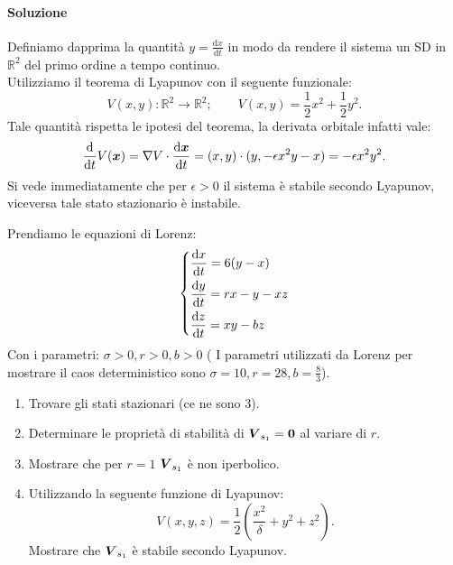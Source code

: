 \paragraph{Soluzione}%
Definiamo dapprima la quantità $y = \frac{\text{d} x}{\text{d} t}$ in modo da rendere il sistema un SD in $\mathbb{R}^2$ del primo ordine a tempo continuo.\\
Utilizziamo il teorema di Lyapunov con il seguente funzionale:
\[
    V(x, y): \mathbb{R}^2\to \mathbb{R}^2; \qquad V(x,y) = \frac{1}{2}x^2+\frac{1}{2}y^2
.\] 
Tale quantità rispetta le ipotesi del teorema, la derivata orbitale infatti vale:
\[
    \frac{\text{d} }{\text{d} t} V(\boldsymbol{x}) = \nabla V \cdot \frac{\text{d} \boldsymbol{x}}{\text{d} t} =
    (x,y) \cdot (y, -\epsilon x^2y - x) = -\epsilon x^2y^2 
.\] 
Si vede immediatamente che per $\epsilon >0$ il sistema è stabile secondo Lyapunov, viceversa tale stato stazionario è instabile.
\begin{ex}
   Prendiamo le equazioni di Lorenz: 
   \[
   \begin{dcases}
       \frac{\text{d} x}{\text{d} t} = 6(y-x) \\
       \frac{\text{d} y}{\text{d} t} = r x - y - xz \\
       \frac{\text{d} z}{\text{d} t} = xy - bz
   \end{dcases}
   \]
   Con i parametri: $\sigma  >0, r > 0 , b > 0$ ( I parametri utilizzati da Lorenz per mostrare il caos deterministico sono $\sigma  = 10, r = 28, b = \frac{8}{3}$).
   \begin{enumerate}
       \item Trovare gli stati stazionari (ce ne sono 3).
       \item Determinare le proprietà di stabilità di $\boldsymbol{V}_{s_1} = \boldsymbol{0}$ al variare di $r$.
       \item Mostrare che per $r = 1$ $\boldsymbol{V}_{s_1}$ è non iperbolico.
       \item Utilizzando la seguente funzione di Lyapunov:
	   \[
	       V(x, y, z) = \frac{1}{2}\left(\frac{x^2}{\delta} + y^2 + z^2\right)
	   .\] 
	 Mostrare che $\boldsymbol{V}_{s_1}$ è stabile secondo Lyapunov.
   \end{enumerate}
\end{ex}

